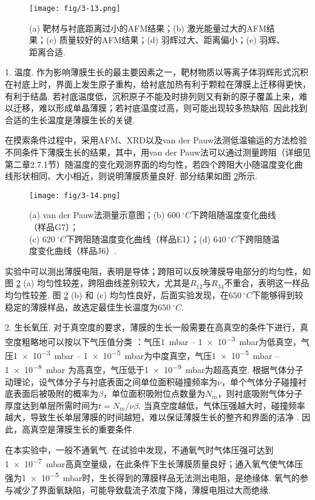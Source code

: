 \documentclass[12pt,a4paper,openany,twoside,UTF-8]{book}
\begin{document}
\begin{figure}[htbp]
\centering
\texttt{[image: fig/3-13.png]}
\caption{(a) 靶材与衬底距离过小的AFM结果；(b) 激光能量过大的AFM结果；(c) 质量较好的AFM结果；(d) 羽辉过大、距离偏小；(e) 羽辉、距离合适.}
\label{fig:3-13} 
\end{figure}

1. 温度. 作为影响薄膜生长的最主要因素之一，靶材物质以等离子体羽辉形式沉积在衬底上时，界面上发生原子重构，给衬底加热有利于颗粒在薄膜上迁移得更快，有利于结晶. 若衬底温度低，沉积原子不能及时排列则又有新的原子覆盖上来，难以迁移，难以形成单晶薄膜；若衬底温度过高，则可能出现较多热缺陷. 因此找到合适的生长温度是薄膜生长的关键.

在摸索条件过程中，采用AFM、XRD以及van der Pauw法测低温输运的方法检验不同条件下薄膜生长的结果，其中，用van der Pauw法可以通过测量跨阻（详细见第二章2.7.1节）随温度的变化观测界面的均匀性，若四个跨阻大小随温度变化曲线形状相同、大小相近，则说明薄膜质量良好. 部分结果如图 \ref{fig:3-14}所示.

\begin{figure}[htbp]
\centering
\texttt{[image: fig/3-14.png]}
\caption{(a) van der Pauw法测量示意图；(b) $\SI{600}{^\circ C}$下跨阻随温度变化曲线（样品G7）；\\
(c) $\SI{620}{^\circ C}$下跨阻随温度变化曲线（样品E1）；(d) $\SI{640}{^\circ C}$下跨阻随温度变化曲线（样品J6）.
}
\label{fig:3-14} 
\end{figure}

实验中可以测出薄膜电阻，表明是导体；跨阻可以反映薄膜导电部分的均匀性，如图 \ref{fig:3-14} (a) 均匀性较差，跨阻曲线差别较大，尤其是$R_{12}$与$R_{34}$不重合，表明这一样品均匀性较差. 图 \ref{fig:3-14} (b) 和 (c) 均匀性良好，后面实验发现，在$\SI{650}{^\circ C}$下能够得到较稳定的薄膜样品，故选定最佳生长温度为$\SI{650}{^\circ C}$.

2. 生长氧压. 对于真空度的要求，薄膜的生长一般需要在高真空的条件下进行，真空度粗略地可以按以下气压值分类 \cite{ref24}：气压\SI{1}{mbar} – \SI{1e-3}{mbar}为低真空，气压\SI{1e-3}{mbar} – \SI{1e-5}{mbar}为中度真空，气压\SI{1e-5}{mbar} – \SI{1e-8}{mbar} 为高真空，气压低于\SI{1e-9}{mbar}为超高真空. 根据气体分子动理论，设气体分子与衬底表面之间单位面积碰撞频率为$\nu$，单个气体分子碰撞衬底表面后被吸附的概率为$\beta$，单位面积吸附位点数量为$N_m$，则衬底吸附气体分子厚度达到单层所需时间为$t = N_m/\nu\beta$. 当真空度越低，气体压强越大时，碰撞频率越大，导致生长单层薄膜的时间越短，难以保证薄膜生长的整齐和界面的洁净 \cite{ref24}. 因此，高真空是薄膜生长的重要条件.

在本实验中，一般不通氧气. 在试验中发现，不通氧气时气体压强可达到 \SI{1e-7}{mbar}高真空量级，在此条件下生长薄膜质量良好；通入氧气使气体压强为\SI{1e-5}{mbar}时，生长得到的薄膜样品无法测出电阻，是绝缘体. 氧气的参与减少了界面氧缺陷，可能导致载流子浓度下降，薄膜电阻过大而绝缘.
\end{document}
